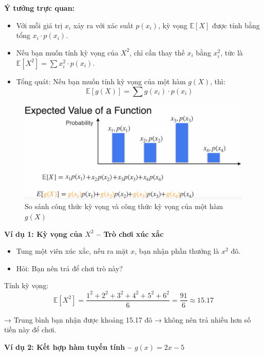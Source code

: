 \documentclass[11pt]{article}
\begin{document}
\vspace{0.5em}
\textbf{Ý tưởng trực quan:}

\begin{itemize}
    \item Với mỗi giá trị $x_i$ xảy ra với xác suất $p(x_i)$, kỳ vọng $\mathbb{E}[X]$ được tính bằng tổng $x_i \cdot p(x_i)$.
    \item Nếu bạn muốn tính kỳ vọng của $X^2$, chỉ cần thay thế $x_i$ bằng $x_i^2$, tức là $\mathbb{E}[X^2] = \sum x_i^2 \cdot p(x_i)$.
    \item Tổng quát: Nếu bạn muốn tính kỳ vọng của một hàm $g(X)$, thì:
    \[
    \mathbb{E}[g(X)] = \sum g(x_i) \cdot p(x_i)
    \]
\end{itemize}

\begin{figure}[H]
    \centering
    \includegraphics[width=0.85\linewidth]{images/expected_value_function.png}
    \caption{So sánh công thức kỳ vọng và công thức kỳ vọng của một hàm $g(X)$}
\end{figure}

\vspace{0.5em}

\textbf{Ví dụ 1: Kỳ vọng của $X^2$ – Trò chơi xúc xắc}
\begin{itemize}
    \item Tung một viên xúc xắc, nếu ra mặt $x$, bạn nhận phần thưởng là $x^2$ đô.
    \item Hỏi: Bạn nên trả để chơi trò này? 
\end{itemize}

Tính kỳ vọng:
\[
\mathbb{E}[X^2] = \frac{1^2 + 2^2 + 3^2 + 4^2 + 5^2 + 6^2}{6} = \frac{91}{6} \approx 15.17
\]

→ Trung bình bạn nhận được khoảng 15.17 đô → không nên trả nhiều hơn số tiền này để chơi. \\ 

\vspace{0.5em}

\textbf{Ví dụ 2: Kết hợp hàm tuyến tính – $g(x) = 2x - 5$}
\end{document}
